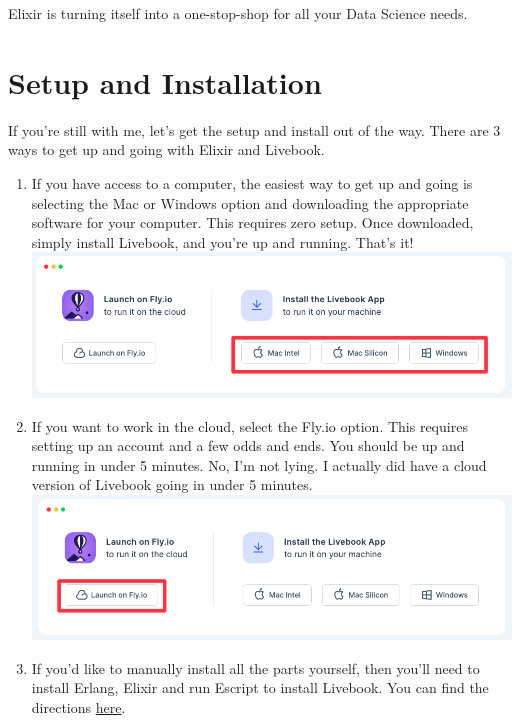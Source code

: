 \documentclass[
  letterpaper,
  DIV=11,
  numbers=noendperiod]{scrreprt}
\begin{document}
Elixir is turning itself into a one-stop-shop for all your Data Science
needs.

\hypertarget{setup-and-installation}{%
\section*{Setup and Installation}\label{setup-and-installation}}

If you're still with me, let's get the setup and install out of the way.
There are 3 ways to get up and going with Elixir and Livebook.

\begin{enumerate}
\def\labelenumi{\arabic{enumi}.}
\item
  If you have access to a computer, the easiest way to get up and going
  is selecting the Mac or Windows option and downloading the appropriate
  software for your computer. This requires zero setup. Once downloaded,
  simply install Livebook, and you're up and running. That's it!
  \includegraphics{./images/1.4-flyio.png}
\item
  If you want to work in the cloud, select the Fly.io option. This
  requires setting up an account and a few odds and ends. You should be
  up and running in under 5 minutes. No, I'm not lying. I actually did
  have a cloud version of Livebook going in under 5 minutes.
  \includegraphics{./images/1.5-flyio.png}
\item
  If you'd like to manually install all the parts yourself, then you'll
  need to install Erlang, Elixir and run Escript to install Livebook.
  You can find the directions
  \href{https://github.com/livebook-dev/livebook\#installation}{here}.
\end{enumerate}
\end{document}
